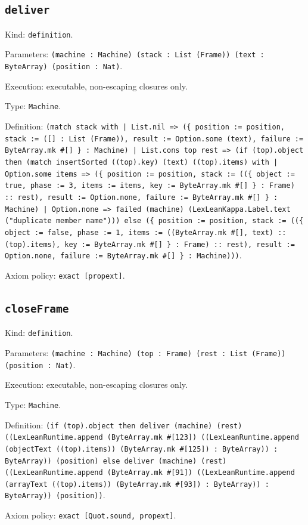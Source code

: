 \documentclass[11pt]{article}
\begin{document}
\subsection*{\texttt{deliver}}
\noindent Kind: \texttt{definition}.\par
\noindent Parameters: \texttt{(machine : Machine) (stack : List (Frame)) (text : ByteArray) (position : Nat)}.\par
\noindent Execution: executable, non-escaping closures only.\par
\noindent Type: \texttt{Machine}.\par
\noindent Definition: \texttt{(match stack with | List.nil => (\{ position := position, stack := ([] : List (Frame)), result := Option.some (text), failure := ByteArray.mk \#[] \} : Machine) | List.cons top rest => (if (top).object then (match insertSorted ((top).key) (text) ((top).items) with | Option.some items => (\{ position := position, stack := ((\{ object := true, phase := 3, items := items, key := ByteArray.mk \#[] \} : Frame) :: rest), result := Option.none, failure := ByteArray.mk \#[] \} : Machine) | Option.none => failed (machine) (LexLeanKappa.Label.text ("duplicate member name"))) else (\{ position := position, stack := ((\{ object := false, phase := 1, items := ((ByteArray.mk \#[], text) :: (top).items), key := ByteArray.mk \#[] \} : Frame) :: rest), result := Option.none, failure := ByteArray.mk \#[] \} : Machine)))}.\par
\noindent Axiom policy: \texttt{exact [propext]}.\par
\subsection*{\texttt{closeFrame}}
\noindent Kind: \texttt{definition}.\par
\noindent Parameters: \texttt{(machine : Machine) (top : Frame) (rest : List (Frame)) (position : Nat)}.\par
\noindent Execution: executable, non-escaping closures only.\par
\noindent Type: \texttt{Machine}.\par
\noindent Definition: \texttt{(if (top).object then deliver (machine) (rest) ((LexLeanRuntime.append (ByteArray.mk \#[123]) ((LexLeanRuntime.append (objectText ((top).items)) (ByteArray.mk \#[125]) : ByteArray)) : ByteArray)) (position) else deliver (machine) (rest) ((LexLeanRuntime.append (ByteArray.mk \#[91]) ((LexLeanRuntime.append (arrayText ((top).items)) (ByteArray.mk \#[93]) : ByteArray)) : ByteArray)) (position))}.\par
\noindent Axiom policy: \texttt{exact [Quot.sound, propext]}.\par
\end{document}
